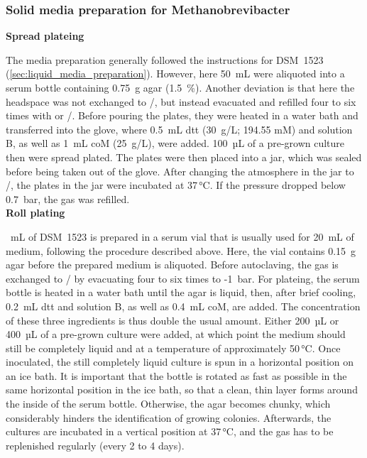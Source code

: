 \subsubsection{Solid media preparation for \textup{Methanobrevibacter}}

\textbf{Spread \gls{plateing}}

\noindent The media preparation generally followed the instructions for DSM~1523 (\cref{sec:liquid_media_preparation}). However, here 50~mL were aliquoted into a serum bottle containing 0.75~g agar (1.5~\%). Another deviation is that here the headspace was not exchanged to /, but instead evacuated and refilled four to six times with  or /. Before pouring the plates, they were heated in a water bath and transferred into the \gls{glove}, where 0.5~mL \acrshort{dtt} (30~g/L; 194.55 mM) and solution B, as well as 1~mL \acrshort{coM} (25~g/L), were added. 100~µL of a pre-grown culture then were spread plated. The plates were then placed into a jar, which was sealed before being taken out of the \gls{glove}. After changing the atmosphere in the jar to /, the plates in the jar were incubated at 37\,°C. If the pressure dropped below 0.7~bar, the gas was refilled.\\

\textbf{Roll plating}

~mL of DSM~1523 is prepared in a serum vial that is usually used for 20~mL of medium, following the procedure described above. Here, the vial contains 0.15~g agar before the prepared medium is aliquoted. Before autoclaving, the gas is exchanged to / by evacuating four to six times to -1~bar. For \gls{plateing}, the serum bottle is heated in a water bath until the agar is liquid, then, after brief cooling, 0.2~mL \acrshort{dtt} and solution B, as well as 0.4~mL \acrshort{coM}, are added. The concentration of these three ingredients is thus double the usual amount. Either 200~µL or 400~µL of a pre-grown culture were added, at which point the medium should still be completely liquid and at a temperature of approximately 50\,°C. Once inoculated, the still completely liquid culture is spun in a horizontal position on an ice bath. It is important that the bottle is rotated as fast as possible in the same horizontal position in the ice bath, so that a clean, thin layer forms around the inside of the serum bottle. Otherwise, the agar becomes chunky, which considerably hinders the identification of growing colonies. Afterwards, the cultures are incubated in a vertical position at 37\,°C, and the gas has to be replenished regularly (every 2 to 4 days).\\


